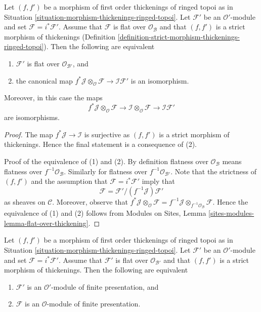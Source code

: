 \begin{lemma}
\label{lemma-deform-module-ringed-topoi}
Let $(f, f')$ be a morphism of first order thickenings of ringed topoi
as in Situation \ref{situation-morphism-thickenings-ringed-topoi}.
Let $\mathcal{F}'$ be an $\mathcal{O}'$-module
and set $\mathcal{F} = i^*\mathcal{F}'$.
Assume that $\mathcal{F}$ is flat over $\mathcal{O}_\mathcal{B}$
and that $(f, f')$ is a strict morphism of thickenings
(Definition \ref{definition-strict-morphism-thickenings-ringed-topoi}).
Then the following are equivalent
\begin{enumerate}
\item $\mathcal{F}'$ is flat over $\mathcal{O}_{\mathcal{B}'}$, and
\item the canonical map
$f^*\mathcal{J} \otimes_\mathcal{O} \mathcal{F} \to
\mathcal{I}\mathcal{F}'$
is an isomorphism.
\end{enumerate}
Moreover, in this case the maps
$$
f^*\mathcal{J} \otimes_\mathcal{O} \mathcal{F} \to
\mathcal{I} \otimes_\mathcal{O} \mathcal{F} \to
\mathcal{I}\mathcal{F}'
$$
are isomorphisms.
\end{lemma}

\begin{proof}
The map $f^*\mathcal{J} \to \mathcal{I}$ is surjective
as $(f, f')$ is a strict morphism of thickenings.
Hence the final statement is a consequence of (2).

\medskip\noindent
Proof of the equivalence of (1) and (2). By definition flatness over
$\mathcal{O}_\mathcal{B}$ means flatness over $f^{-1}\mathcal{O}_\mathcal{B}$.
Similarly for flatness over $f^{-1}\mathcal{O}_{\mathcal{B}'}$.
Note that the strictness of $(f, f')$ and the assumption that
$\mathcal{F} = i^*\mathcal{F}'$ imply that
$$
\mathcal{F} = \mathcal{F}'/(f^{-1}\mathcal{J})\mathcal{F}'
$$
as sheaves on $\mathcal{C}$. Moreover, observe that
$f^*\mathcal{J} \otimes_\mathcal{O} \mathcal{F} =
f^{-1}\mathcal{J} \otimes_{f^{-1}\mathcal{O}_\mathcal{B}} \mathcal{F}$.
Hence the equivalence of (1) and (2) follows from
Modules on Sites, Lemma \ref{sites-modules-lemma-flat-over-thickening}.
\end{proof}

\begin{lemma}
\label{lemma-deform-fp-module-ringed-topoi}
Let $(f, f')$ be a morphism of first order thickenings of ringed topoi
as in Situation \ref{situation-morphism-thickenings-ringed-topoi}.
Let $\mathcal{F}'$ be an $\mathcal{O}'$-module
and set $\mathcal{F} = i^*\mathcal{F}'$.
Assume that $\mathcal{F}'$ is flat over $\mathcal{O}_{\mathcal{B}'}$
and that $(f, f')$ is a strict morphism of thickenings.
Then the following are equivalent
\begin{enumerate}
\item $\mathcal{F}'$ is an $\mathcal{O}'$-module of finite presentation, and
\item $\mathcal{F}$ is an $\mathcal{O}$-module of finite presentation.
\end{enumerate}
\end{lemma}

